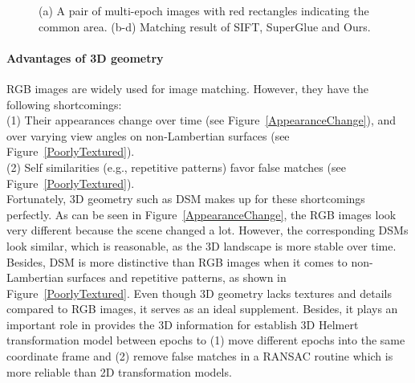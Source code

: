\begin{figure}[htbp]
\begin{center}
{\begin{minipage}[t]{0.45\linewidth}
	\end{minipage}%
}
		\caption{(a) A pair of multi-epoch images with red rectangles indicating the common area. (b-d) Matching result of SIFT, SuperGlue and Ours.}
		\label{MultiEpochImgPair}
	\end{center}
\end{figure}

\paragraph{Advantages of 3D geometry}
RGB images are widely used for image matching. However, they have the following shortcomings:\\
(1) Their appearances change over time (see Figure~\ref{AppearanceChange}), and over varying view angles on non-Lambertian surfaces (see Figure~\ref{PoorlyTextured}).\\
(2) Self similarities (e.g., repetitive patterns) favor false matches (see Figure~\ref{PoorlyTextured}).\\
Fortunately, 3D geometry such as \ac{DSM} makes up for these shortcomings perfectly. As can be seen in Figure~\ref{AppearanceChange}, the RGB images look very different because the scene changed a lot. However, the corresponding \ac{DSM}s look similar, which is reasonable, as the 3D landscape is more stable over time. Besides, \ac{DSM} is more distinctive than RGB images when it comes to non-Lambertian surfaces and repetitive patterns, as shown in Figure~\ref{PoorlyTextured}. 
Even though 3D geometry lacks textures and details compared to RGB images, it serves as an ideal supplement. Besides, it plays an important role in provides the 3D information for establish 3D Helmert transformation model between epochs to (1) move different epochs into the same coordinate frame and (2) remove false matches in a RANSAC routine which is more reliable than 2D transformation models.

